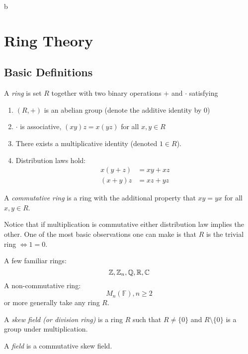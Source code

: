 b\documentclass[master.tex]{subfiles}
\begin{document}
\section{Ring Theory}
\subsection{Basic Definitions}
\newcommand{\F}{\mathbb{F}} \newtheorem*{notation}{Notation}

\begin{defn*}
  A \emph{ring} is set \(R\) together with two binary operations \(+\) and \(\cdot\) satisfying
  \begin{enumerate}[label=(\roman*)]
  \item \((R,+)\) is an abelian group (denote the additive identity by \(0\))
  \item \(\cdot\) is associative, \((xy)z=x(yz)\) for all \(x,y \in R\)
  \item There exists a multiplicative identity (denoted \(1 \in R\)).
  \item Distribution laws hold:
    \begin{align*}
      x(y+z) &= xy + xz\\
      (x+y)z &= xz+yz
    \end{align*}
  \end{enumerate}
\end{defn*}

\begin{defn*}
  A \emph{commutative ring} is a ring with the additional property that \(xy=yx\) for all \(x,y \in R\).
\end{defn*}
Notice that if multiplication is commutative either distribution law implies the other. One of the most basic
observations one can make is that \(R\) is the trivial ring \(\iff 1=0\).

\begin{example*}
  A few familiar rings: \[{\mathbb Z},{\mathbb Z}_n,{\mathbb Q},{\mathbb R},{\mathbb C}\] A non-commutative ring:
  \[M_n(\F), n \ge 2\] or more generally take any ring \(R\).
\end{example*}

\begin{defn*}
  A \emph{skew field (or division ring)} is a ring \(R\) such that \(R \neq \{0\}\) and \(R \setminus \{0\}\) is a group
  under multiplication.
\end{defn*}

\begin{defn*}
  A \emph{field} is a commutative skew field.
\end{defn*}
\end{document}
